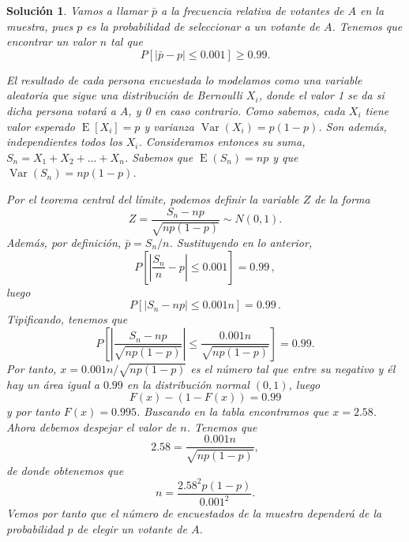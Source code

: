 \documentclass[
  a4paper,
  spanish,
  12pt,
]{scrartcl}
\theoremstyle{ejercicio-style}
\theoremstyle{remark-style}
\newtheorem*{sol}{Solución}
\begin{document}
\begin{sol}

  Vamos a llamar \(\bar{p}\) a la frecuencia relativa de votantes de \(A\) en la muestra, pues \(p\) es la probabilidad de seleccionar a un votante de \(A\).
  Tenemos que encontrar un valor \(n\) tal que
  \[
    P[|\bar{p}-p| \leq 0.001] \geq 0.99.
  \]

  El resultado de cada persona encuestada lo modelamos como una variable aleatoria que sigue una distribución de Bernoulli \(X_i\), donde el valor 1 se da si dicha persona votará a \(A\), y 0 en caso contrario.
  Como sabemos, cada \(X_i\) tiene valor esperado \(\operatorname{E}[X_i] = p\) y varianza \(\operatorname{Var}(X_i) = p(1-p)\).
  Son además, independientes todos los \(X_i\).
  Consideramos entonces su suma, \(S_n = X_1 + X_2 + \dots + X_n\).
  Sabemos que \(\operatorname{E}(S_n) = np\) y que \(\operatorname{Var}(S_n) = np(1-p)\).

  Por el teorema central del límite, podemos definir la variable \(Z\) de la forma
  \[
    Z = \frac{S_n - np}{\sqrt{np(1-p)}} \sim N(0,1).
  \]
  Además, por definición, \(\bar{p} = S_n/n\). Sustituyendo en lo anterior,
  \[
    P\left[\left|\frac{S_n}{n} - p\right| \leq 0.001\right] = 0.99\,,
  \]
  luego
  \[
    P\left[\left|S_n - np\right| \leq 0.001n\right] = 0.99\,.
  \]
  Tipificando, tenemos que
  \[
    P\left[
      \left|\frac{S_n - np}{\sqrt{np(1-p)}}\right| \leq \frac{0.001n}{\sqrt{np(1-p)}}
    \right] = 0.99.
  \]
  Por tanto, \(x = 0.001n/\sqrt{np(1-p)}\) es el número tal que entre su negativo y él hay un área igual a \(0.99\) en la distribución normal \((0,1)\), luego
  \[
    F(x) - (1-F(x)) = 0.99
  \]
  y por tanto \(F(x) = 0.995\). Buscando en la tabla encontramos que \(x = 2.58\). Ahora debemos despejar el valor de \(n\). Tenemos que
  \[
    2.58 = \frac{0.001n}{\sqrt{np(1-p)}},
  \]
  de donde obtenemos que
  \[
    n = \frac{2.58^2 p(1-p)}{0.001^2}.
  \]
  Vemos por tanto que el número de encuestados de la muestra dependerá de la probabilidad \(p\) de elegir un votante de \(A\).
\end{sol}
\end{document}
